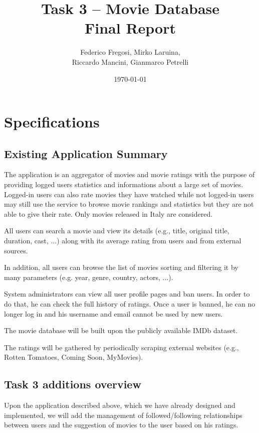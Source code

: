\documentclass[11pt]{article}
\title{Task 3 -- Movie Database\\ 
	\Large Final Report}
\date{\today}
\author{Federico Fregosi, Mirko Laruina,\\
        Riccardo Mancini, Gianmarco Petrelli}
\begin{document}
\maketitle
\vfill
\setcounter{tocdepth}{2}
\tableofcontents
\vfill
\clearpage
\setcounter{page}{1}

\section{Specifications}

\subsection{Existing Application Summary}
The application is an aggregator of movies and movie ratings with the purpose 
of providing logged users statistics and informations about a large set of movies.
Logged-in users can also rate movies they have watched while not logged-in users 
may still use the service to browse movie rankings and statistics but they are not
able to give their rate. Only movies released in Italy are considered.

All users can search a movie and view its details (e.g., title, original title, duration, 
cast, ...) along with its average rating from users and from external sources. 

In addition, all users can browse the list of movies sorting and filtering it by many parameters
(e.g. year, genre, country, actors, ...).

System administrators can view all user profile pages and ban users. In order to do that, he can 
check the full history of ratings. Once a user is banned, he can no longer log in and his username and email cannot be used by new users.

The movie database will be built upon the publicly available IMDb dataset.

The ratings will be gathered by periodically scraping external websites 
(e.g., Rotten Tomatoes, Coming Soon, MyMovies).

\subsection{Task 3 additions overview}
Upon the application described above, which we have already designed and 
implemented, we will add the management of followed/following relationships 
between users and the suggestion of movies to the user based on his ratings.
\end{document}
